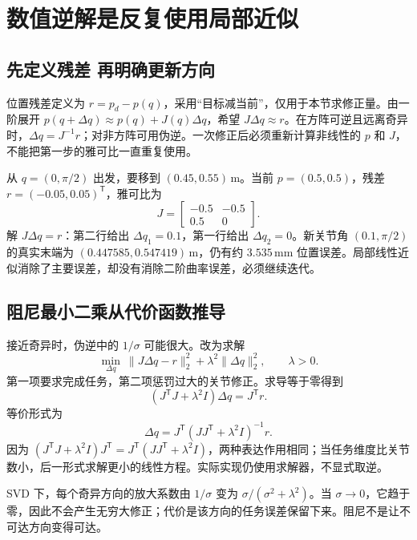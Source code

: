 \section{数值逆解是反复使用局部近似}
\subsection{先定义残差 再明确更新方向}
位置残差定义为 $r=p_d-p(q)$，采用“目标减当前”，仅用于本节求修正量。由一阶展开 $p(q+\Delta q)\approx p(q)+J(q)\Delta q$，希望 $J\Delta q\approx r$。在方阵可逆且远离奇异时，$\Delta q=J^{-1}r$；对非方阵可用伪逆。一次修正后必须重新计算非线性的 $p$ 和 $J$，不能把第一步的雅可比一直重复使用。

\begin{examplebox}[算例 一次牛顿修正并不直接等于最终答案]
从 $q=(0,\pi/2)$ 出发，要移到 $(0.45,0.55)\,\mathrm m$。当前 $p=(0.5,0.5)$，残差 $r=(-0.05,0.05)^\mathsf T$，雅可比为
\[
 J=\begin{bmatrix}-0.5&-0.5\\0.5&0\end{bmatrix}.
\]
解 $J\Delta q=r$：第二行给出 $\Delta q_1=0.1$，第一行给出 $\Delta q_2=0$。新关节角 $(0.1,\pi/2)$ 的真实末端为 $(0.447585,0.547419)\,\mathrm m$，仍有约 $3.535\,\mathrm{mm}$ 位置误差。局部线性近似消除了主要误差，却没有消除二阶曲率误差，必须继续迭代。
\end{examplebox}

\subsection{阻尼最小二乘从代价函数推导}
接近奇异时，伪逆中的 $1/\sigma$ 可能很大。改为求解
\begin{equation}
 \min_{\Delta q}\ \|J\Delta q-r\|_2^2+\lambda^2\|\Delta q\|_2^2,
 \qquad\lambda>0.
\end{equation}
第一项要求完成任务，第二项惩罚过大的关节修正。求导等于零得到
\begin{equation}
 (J^\mathsf TJ+\lambda^2I)\Delta q=J^\mathsf Tr.
\end{equation}
等价形式为
\begin{equation}\label{eq:dls}
 \Delta q=J^\mathsf T(JJ^\mathsf T+\lambda^2I)^{-1}r.
\end{equation}
因为 $(J^\mathsf TJ+\lambda^2I)J^\mathsf T=J^\mathsf T(JJ^\mathsf T+\lambda^2I)$，两种表达作用相同；当任务维度比关节数小，后一形式求解更小的线性方程。实际实现仍使用求解器，不显式取逆。

SVD 下，每个奇异方向的放大系数由 $1/\sigma$ 变为 $\sigma/(\sigma^2+\lambda^2)$。当 $\sigma\to0$，它趋于零，因此不会产生无穷大修正；代价是该方向的任务误差保留下来。阻尼不是让不可达方向变得可达。

